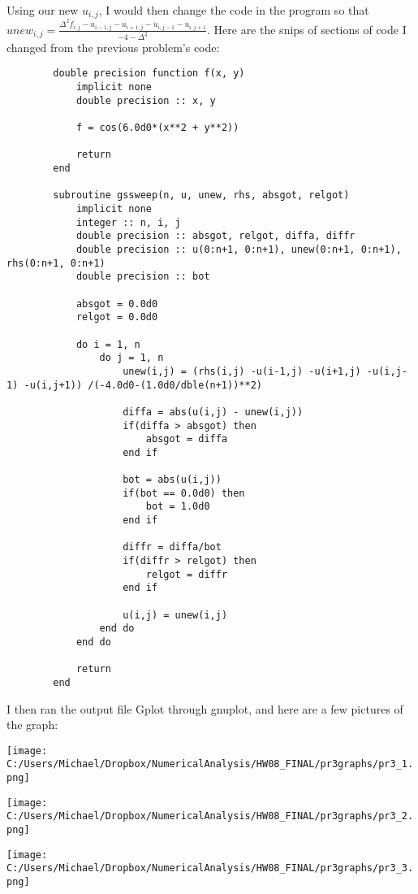 \documentclass{article}
\begin{document}
	\bigskip
	Using our new $u_{i,j}$, I would then change the code in the program so that $unew_{i,j}=\frac{\Delta^2f_{i,j}-u_{i-1,j}-u_{i+1,j}-u_{i,j-1}-u_{i,j+1}}{-4-\Delta^2}$. Here are the snips of sections of code I changed from the previous problem's code:
	
	
	\begin{verbatim}
		double precision function f(x, y)
			implicit none
			double precision :: x, y

			f = cos(6.0d0*(x**2 + y**2))

			return
		end
		
		subroutine gssweep(n, u, unew, rhs, absgot, relgot)
			implicit none
			integer :: n, i, j
			double precision :: absgot, relgot, diffa, diffr
			double precision :: u(0:n+1, 0:n+1), unew(0:n+1, 0:n+1), rhs(0:n+1, 0:n+1)
			double precision :: bot

			absgot = 0.0d0 
			relgot = 0.0d0 

			do i = 1, n 
				do j = 1, n 
					unew(i,j) = (rhs(i,j) -u(i-1,j) -u(i+1,j) -u(i,j-1) -u(i,j+1)) /(-4.0d0-(1.0d0/dble(n+1))**2)
					
					diffa = abs(u(i,j) - unew(i,j))
					if(diffa > absgot) then 
						absgot = diffa
					end if
					
					bot = abs(u(i,j))
					if(bot == 0.0d0) then
						bot = 1.0d0 
					end if
					
					diffr = diffa/bot 
					if(diffr > relgot) then
						relgot = diffr 
					end if 
					
					u(i,j) = unew(i,j)
				end do 
			end do

			return
		end
	\end{verbatim}
	
	I then ran the output file Gplot through gnuplot, and here are a few pictures of the graph:
		
	\begin{center}
		\texttt{[image: C:/Users/Michael/Dropbox/NumericalAnalysis/HW08\_FINAL/pr3graphs/pr3\_1.png]}
	\end{center}
		
	\begin{center}
		\texttt{[image: C:/Users/Michael/Dropbox/NumericalAnalysis/HW08\_FINAL/pr3graphs/pr3\_2.png]}
	\end{center}
		
	\begin{center}
		\texttt{[image: C:/Users/Michael/Dropbox/NumericalAnalysis/HW08\_FINAL/pr3graphs/pr3\_3.png]}
	\end{center}
\end{document}
